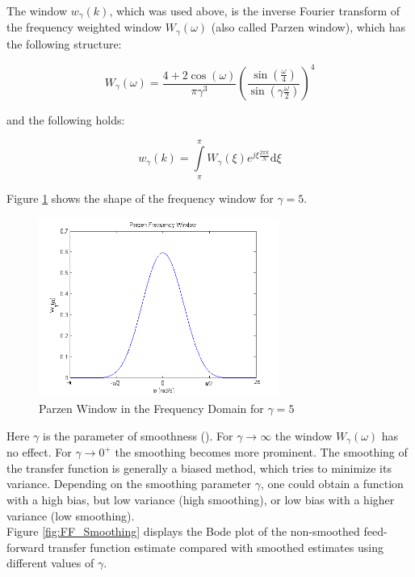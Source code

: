 The window $w_\gamma(k)$, which was used above, is the inverse Fourier transform of the frequency weighted window $W_\gamma(\omega)$ (also called Parzen window), which has the following structure:

\[W_\gamma(\omega) = \frac{4+2\cos(\omega)}{\pi \gamma^3}\left( \frac{\sin(\frac{\omega}{4})}{\sin(\gamma\frac{\omega}{2})}\right)^4 \]

and the following holds:

\[w_\gamma(k) = \int\limits_\pi^\pi W_\gamma(\xi)e^{j\xi \frac{2\pi k}{N}}\text{d}\xi\]

Figure \ref{fig:parzen} shows the shape of the frequency window for $\gamma = 5$.


\begin{figure}[h]
\centering
\includegraphics[width=0.7\textwidth]{pics/parzen}
\caption{Parzen Window in the Frequency Domain for $\gamma = 5$ }
\label{fig:parzen}
\end{figure}



Here $\gamma$ is the parameter of smoothness (\cite{ljung1999system}). For $\gamma \rightarrow \infty$ the window $W_\gamma(\omega)$ has no effect. For $\gamma \rightarrow 0^+$ the smoothing becomes more prominent. The smoothing of the transfer function is generally a biased method, which tries to minimize its variance. Depending on the smoothing parameter $\gamma$, one could obtain a function with a high bias, but low variance (high smoothing), or low bias with a higher variance (low smoothing). \\

Figure \ref{fig:FF_Smoothing} displays the Bode plot of the non-smoothed feed-forward transfer function estimate compared with smoothed estimates using different values of $\gamma$.


